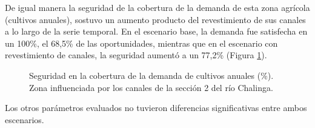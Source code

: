 \documentclass[]{article}
\begin{document}
De igual manera la seguridad de la cobertura de la demanda de esta zona agrícola (cultivos anuales), sostuvo un aumento producto del revestimiento de sus canales a lo largo de la serie temporal. En el escenario base, la demanda fue satisfecha en un 100\%, el 68,5\% de las oportunidades, mientras que en el escenario con revestimiento de canales, la seguridad aumentó a un 77,2\% (Figura \ref{etiqueta_figura10}).

\begin{figure}[H]
\begin{center}
\caption{Seguridad en la cobertura de la demanda de cultivos anuales (\%). Zona influenciada por los canales de la sección 2 del río Chalinga.}
\label{etiqueta_figura10}
\end{center}
\end{figure}

Los otros parámetros evaluados no tuvieron diferencias significativas entre ambos escenarios.
\end{document}
